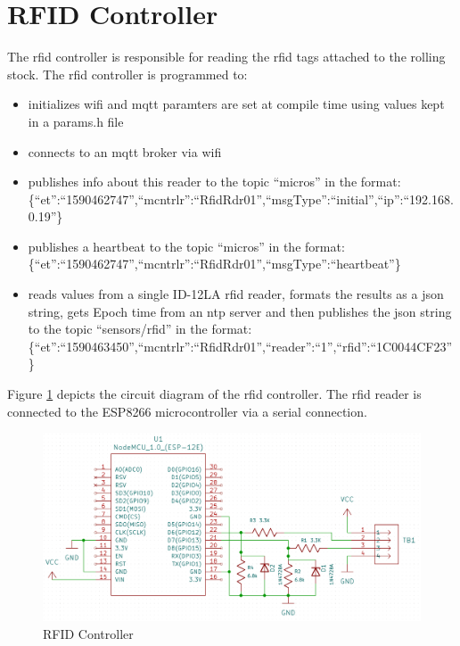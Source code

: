 \section{RFID Controller} 
\label{sec:rfid-controller}
The \gls{rfid} controller is responsible for reading the \gls{rfid} tags attached to the rolling stock. The \gls{rfid} controller is programmed to:
\begin{itemize}
	\item initializes \gls{wifi} and \gls{mqtt} paramters are set at compile time using values kept in a params.h file
	\item connects to an \gls{mqtt} broker via \gls{wifi}
	\item publishes info about this reader to the topic ``micros'' in the format: \\
\{``et'':``1590462747'',``mcntrlr'':``RfidRdr01'',``msgType'':``initial'',``ip'':``192.168.0.19''\}
	\item publishes a heartbeat to the topic ``micros'' in the format: \\
\{``et'':``1590462747'',``mcntrlr'':``RfidRdr01'',``msgType'':``heartbeat''\}
	\item reads values from a single ID-12LA \gls{rfid} reader, formats the results as a \gls{json} string, 
gets Epoch time from an \gls{ntp} server and then publishes the \gls{json} string to the topic ``sensors/rfid''
in the format: \\
\{``et'':``1590463450'',``mcntrlr'':``RfidRdr01'',``reader'':``1'',``rfid'':``1C0044CF23''\}
\end{itemize}

Figure \ref{fig:rfid_schematic} depicts the circuit diagram of the \gls{rfid} controller. The \gls{rfid} reader is connected to the ESP8266 microcontroller via a serial connection.

\begin{figure}[htbp]
    \centering
    \includegraphics[scale=0.18]{../Images/rfid_schematic.png}
    \caption{RFID Controller}
    \label{fig:rfid_schematic}
\end{figure}

